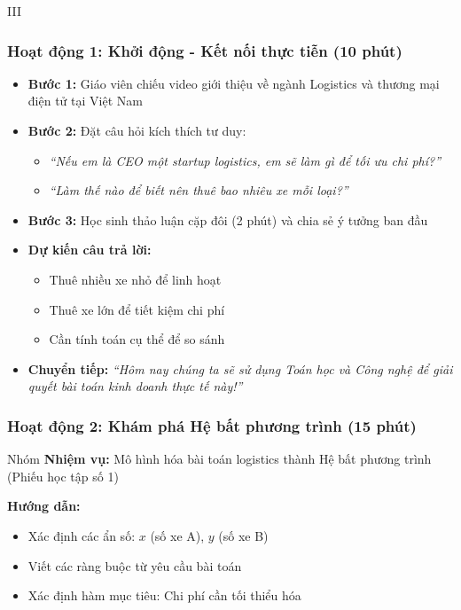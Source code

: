 \documentclass[12pt,a4paper]{article}
\begin{document}
\begin{competitionsection}{III}
\subsubsection*{Hoạt động 1: Khởi động - Kết nối thực tiễn (10 phút)}
\begin{itemize}[leftmargin=*,noitemsep]
\item \textbf{Bước 1:} Giáo viên chiếu video giới thiệu về ngành Logistics và thương mại điện tử tại Việt Nam
\item \textbf{Bước 2:} Đặt câu hỏi kích thích tư duy:
    \begin{itemize}
    \item \textit{``Nếu em là CEO một startup logistics, em sẽ làm gì để tối ưu chi phí?''}
    \item \textit{``Làm thế nào để biết nên thuê bao nhiêu xe mỗi loại?''}
    \end{itemize}
\item \textbf{Bước 3:} Học sinh thảo luận cặp đôi (2 phút) và chia sẻ ý tưởng ban đầu
\item \textbf{Dự kiến câu trả lời:}
    \begin{itemize}
    \item Thuê nhiều xe nhỏ để linh hoạt
    \item Thuê xe lớn để tiết kiệm chi phí
    \item Cần tính toán cụ thể để so sánh
    \end{itemize}
\item \textbf{Chuyển tiếp:} \textit{``Hôm nay chúng ta sẽ sử dụng Toán học và Công nghệ để giải quyết bài toán kinh doanh thực tế này!''}
\end{itemize}

\subsubsection*{Hoạt động 2: Khám phá Hệ bất phương trình (15 phút)}
\begin{task}{Nhóm}
\textbf{Nhiệm vụ:} Mô hình hóa bài toán logistics thành Hệ bất phương trình (Phiếu học tập số 1)

\textbf{Hướng dẫn:}
\begin{itemize}[leftmargin=*,noitemsep]
\item Xác định các ẩn số: $x$ (số xe A), $y$ (số xe B)
\item Viết các ràng buộc từ yêu cầu bài toán
\item Xác định hàm mục tiêu: Chi phí cần tối thiểu hóa
\end{itemize}
\end{task}


\end{competitionsection}
\end{document}
